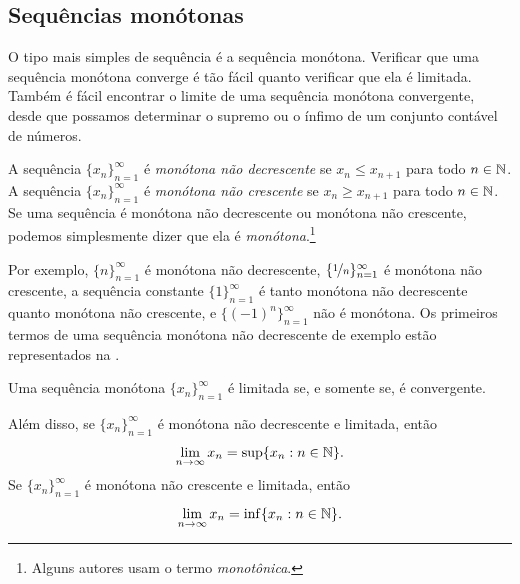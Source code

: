 \subsection{Sequ\^encias mon\'otonas}

O tipo mais simples de sequência é a sequência monótona. Verificar que uma
sequência monótona converge é tão fácil quanto verificar que ela é limitada.
Também é fácil encontrar o limite de uma sequência monótona convergente,
desde que possamos determinar o supremo ou o ínfimo de um conjunto contável
de números.

\begin{defn}
A sequência $\{ x_n \}_{n=1}^\infty$ é \emph{monótona não decrescente} se $x_n \leq x_{n+1}$ para todo $n \in {\mathbb{N}}$.
%
A sequência $\{ x_n \}_{n=1}^\infty$ é \emph{monótona não crescente} se $x_n \geq x_{n+1}$ para todo $n \in {\mathbb{N}}$.
%
Se uma sequência é monótona não decrescente ou monótona não crescente,
podemos simplesmente dizer que ela é \emph{monótona}.\footnote{Alguns autores usam o termo
\emph{monotônica}.}
\end{defn}

Por exemplo, $\{ n \}_{n=1}^\infty$ é monótona não decrescente,
$\{ \nicefrac{1}{n} \}_{n=1}^\infty$ é monótona não crescente,
a sequência constante $\{ 1 \}_{n=1}^\infty$ é tanto monótona não
decrescente quanto monótona não crescente, e
$\bigl\{ {(-1)}^n \bigr\}_{n=1}^\infty$ não é monótona.
Os primeiros termos de uma sequência monótona não decrescente de exemplo
estão representados na .

\begin{myfigureht}
\caption{Os primeiros termos de uma sequência monótona não decrescente,
representados em um gráfico.\label{figsequenceincreasing}}
\end{myfigureht}

\begin{thm} \label{thm:monotoneconv}
%
Uma sequência monótona $\{ x_n \}_{n=1}^\infty$ é limitada se, e somente se,
é convergente.

Além disso, se $\{ x_n \}_{n=1}^\infty$ é monótona não decrescente e limitada, então
\begin{equation*}
\lim_{n\to \infty} x_n = \sup \{ x_n : n \in {\mathbb{N}} \} .
\end{equation*}
Se $\{ x_n \}_{n=1}^\infty$ é monótona não crescente e limitada, então
\begin{equation*}
\lim_{n\to \infty} x_n = \inf \{ x_n : n \in {\mathbb{N}} \} .
\end{equation*}
\end{thm}

